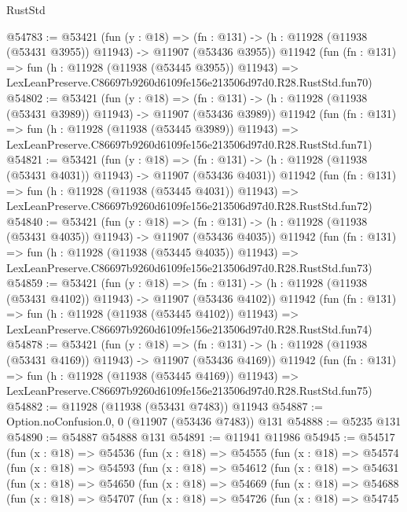 \begin{lexlean}{RustStd}
\begin{coremodule}
@54783 := @53421
    (fun (y : @18) =>
    (fn : @131) -> (h : @11928 (@11938 (@53431 @3955)) @11943) -> @11907 (@53436 @3955))
    @11942
    (fun (fn : @131) =>
    fun (h : @11928 (@11938 (@53445 @3955)) @11943) =>
    LexLeanPreserve.C86697b9260d6109fe156e213506d97d0.R28.RustStd.fun70)
@54802 := @53421
    (fun (y : @18) =>
    (fn : @131) -> (h : @11928 (@11938 (@53431 @3989)) @11943) -> @11907 (@53436 @3989))
    @11942
    (fun (fn : @131) =>
    fun (h : @11928 (@11938 (@53445 @3989)) @11943) =>
    LexLeanPreserve.C86697b9260d6109fe156e213506d97d0.R28.RustStd.fun71)
@54821 := @53421
    (fun (y : @18) =>
    (fn : @131) -> (h : @11928 (@11938 (@53431 @4031)) @11943) -> @11907 (@53436 @4031))
    @11942
    (fun (fn : @131) =>
    fun (h : @11928 (@11938 (@53445 @4031)) @11943) =>
    LexLeanPreserve.C86697b9260d6109fe156e213506d97d0.R28.RustStd.fun72)
@54840 := @53421
    (fun (y : @18) =>
    (fn : @131) -> (h : @11928 (@11938 (@53431 @4035)) @11943) -> @11907 (@53436 @4035))
    @11942
    (fun (fn : @131) =>
    fun (h : @11928 (@11938 (@53445 @4035)) @11943) =>
    LexLeanPreserve.C86697b9260d6109fe156e213506d97d0.R28.RustStd.fun73)
@54859 := @53421
    (fun (y : @18) =>
    (fn : @131) -> (h : @11928 (@11938 (@53431 @4102)) @11943) -> @11907 (@53436 @4102))
    @11942
    (fun (fn : @131) =>
    fun (h : @11928 (@11938 (@53445 @4102)) @11943) =>
    LexLeanPreserve.C86697b9260d6109fe156e213506d97d0.R28.RustStd.fun74)
@54878 := @53421
    (fun (y : @18) =>
    (fn : @131) -> (h : @11928 (@11938 (@53431 @4169)) @11943) -> @11907 (@53436 @4169))
    @11942
    (fun (fn : @131) =>
    fun (h : @11928 (@11938 (@53445 @4169)) @11943) =>
    LexLeanPreserve.C86697b9260d6109fe156e213506d97d0.R28.RustStd.fun75)
@54882 := @11928 (@11938 (@53431 @7483)) @11943
@54887 := Option.noConfusion.{0, 0} (@11907 (@53436 @7483)) @131
@54888 := @5235 @131
@54890 := @54887 @54888 @131
@54891 := @11941 @11986
@54945 := @54517
    (fun (x : @18) =>
    @54536
      (fun (x : @18) =>
      @54555
        (fun (x : @18) =>
        @54574
          (fun (x : @18) =>
          @54593
            (fun (x : @18) =>
            @54612
              (fun (x : @18) =>
              @54631
                (fun (x : @18) =>
                @54650
                  (fun (x : @18) =>
                  @54669
                    (fun (x : @18) =>
                    @54688
                      (fun (x : @18) =>
                      @54707
                        (fun (x : @18) =>
                        @54726
                          (fun (x : @18) =>
                          @54745

\end{coremodule}
\end{lexlean}
